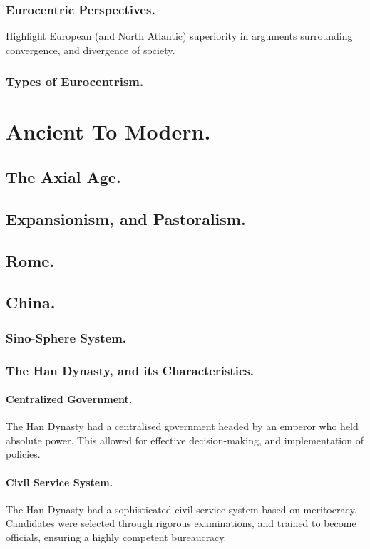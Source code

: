 \documentclass[11pt]{book}
\begin{document}
				\subsubsection{Eurocentric Perspectives.}
					Highlight European (and North Atlantic) superiority in arguments surrounding convergence, and divergence of society.
				
				\subsubsection{Types of Eurocentrism.}

						\section{Ancient To Modern.}
			\subsection{The Axial Age.}
			\subsection{Expansionism, and Pastoralism.}
			\subsection{Rome.}
			\subsection{China.}
				\subsubsection{Sino-Sphere System.}
				
				
				\subsubsection{The Han Dynasty, and its Characteristics.}
					\paragraph{Centralized Government.}
						The Han Dynasty had a centralised government headed by an emperor who held absolute power. This allowed for effective decision-making, and implementation of policies.
					\paragraph{Civil Service System.}
						The Han Dynasty had a sophisticated civil service system based on meritocracy. Candidates were selected through rigorous examinations, and trained to become officials, ensuring a highly competent bureaucracy.
\end{document}
